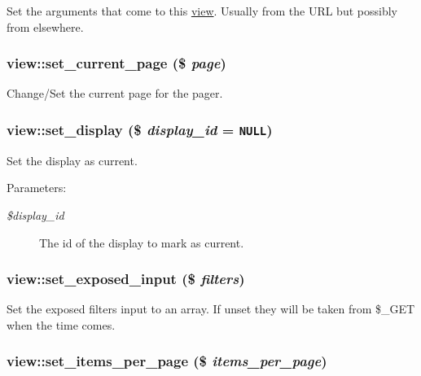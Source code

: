 Set the arguments that come to this \hyperlink{classview}{view}. Usually from the URL but possibly from elsewhere. \hypertarget{classview_421f000fc97fb8f7dda965cbdd285071}{
\subsubsection[{set\_\-current\_\-page}]{\setlength{\rightskip}{0pt plus 5cm}view::set\_\-current\_\-page (\$ {\em page})}}
\label{classview_421f000fc97fb8f7dda965cbdd285071}


Change/Set the current page for the pager. \hypertarget{classview_afb326696e2de96d2012882b5275c54c}{
\subsubsection[{set\_\-display}]{\setlength{\rightskip}{0pt plus 5cm}view::set\_\-display (\$ {\em display\_\-id} = {\tt NULL})}}
\label{classview_afb326696e2de96d2012882b5275c54c}


Set the display as current.

\begin{Desc}
\item[Parameters:]
\begin{description}
\item[{\em \$display\_\-id}]The id of the display to mark as current. \end{description}
\end{Desc}
\hypertarget{classview_be2340e413d0ef7a6dfeba37f09fc88c}{
\subsubsection[{set\_\-exposed\_\-input}]{\setlength{\rightskip}{0pt plus 5cm}view::set\_\-exposed\_\-input (\$ {\em filters})}}
\label{classview_be2340e413d0ef7a6dfeba37f09fc88c}


Set the exposed filters input to an array. If unset they will be taken from \$\_\-GET when the time comes. \hypertarget{classview_d1f69acfdb3771ec2d6f54fdb7ed7e4c}{
\subsubsection[{set\_\-items\_\-per\_\-page}]{\setlength{\rightskip}{0pt plus 5cm}view::set\_\-items\_\-per\_\-page (\$ {\em items\_\-per\_\-page})}}
\label{classview_d1f69acfdb3771ec2d6f54fdb7ed7e4c}


